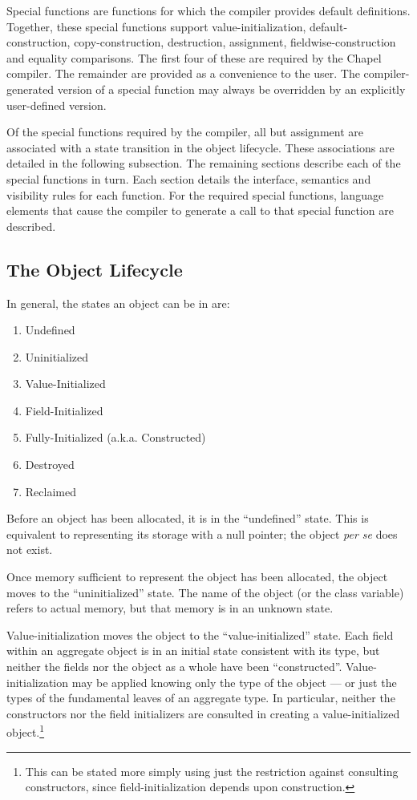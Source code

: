 
Special functions are functions for which the compiler provides default definitions.  
Together, these special functions support
value-initialization, default-construction,
copy-construction, destruction, assignment, fieldwise-construction and equality comparisons.
The first four of these are required by the Chapel
compiler.  The remainder are provided as a convenience
to the user.  The compiler-generated version of a special function may always be
overridden by an explicitly user-defined version.

Of the special functions required by the compiler, all but assignment are associated with
a state transition in the object lifecycle.  These associations are detailed in the
following subsection.  The remaining sections describe each of the special functions in
turn.  Each section details the interface, semantics and visibility rules for each
function.  For the required special functions, language elements that cause
the compiler to generate a call to that special function are described.


\subsection{The Object Lifecycle}

In general, the states an object can be in are:
\begin{enumerate}
\item Undefined
\item Uninitialized
\item Value-Initialized
\item Field-Initialized
\item Fully-Initialized (a.k.a. Constructed)
\item Destroyed
\item Reclaimed
\end{enumerate}

Before an object has been allocated, it is in the ``undefined'' state.  This is
equivalent to representing its storage with a null pointer; the object {\it per
se} does not exist.

Once memory sufficient to represent the object has been allocated, the object
moves to the ``uninitialized'' state.  The name of the object (or the class
variable) refers to actual memory, but that memory is in an unknown state.

Value-initialization moves the object to the ``value-initialized'' state.  Each
field within an aggregate object is in an initial state consistent with its type,
but neither the fields nor the object as a whole have been ``constructed''.
Value-initialization may be applied knowing only the type of the object --- or
just the types of the fundamental leaves of an aggregate type.  In particular,
neither the constructors nor the field initializers are consulted in creating a
value-initialized object.\footnote{This can be stated more simply using just the
  restriction against consulting constructors, since field-initialization
  depends upon construction.}

